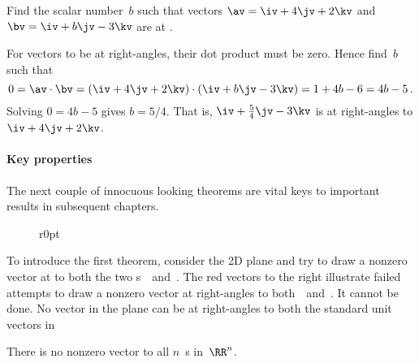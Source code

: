 \begin{example} 
Find the scalar number~\(b\) such that vectors \(\av=\iv+4\jv+2\kv\) and \(\bv=\iv+b\jv-3\kv\) are at .
\begin{solution} 
For vectors to be at right-angles, their dot product must be zero.
Hence find~\(b\) such that
\begin{equation*}
0=\av\cdot\bv=(\iv+4\jv+2\kv)\cdot(\iv+b\jv-3\kv)
=1+4b-6=4b-5\,.
\end{equation*}
Solving \(0=4b-5\) gives \(b=5/4\).
That is, \(\iv+\tfrac54\jv-3\kv\) is at right-angles to \(\iv+4\jv+2\kv\).
\end{solution}
\end{example}




\paragraph{Key properties}
The next couple of innocuous looking theorems are vital keys to important results in subsequent chapters.

%
\begin{wrapfigure}r{0pt}
\end{wrapfigure}
To introduce the first theorem, consider the 2D plane and try to draw a nonzero vector at  to both the two s~\iv\ and~\jv.
The red vectors to the right illustrate failed attempts to draw a nonzero vector at right-angles to both~\iv\ and~\jv.
It cannot be done. 
No vector in the plane can be at right-angles to both the standard unit vectors in 


\begin{theorem} \label{thm:nononz}
There is no nonzero vector  to all \(n\)~s in~\(\RR^n\).
\end{theorem}

